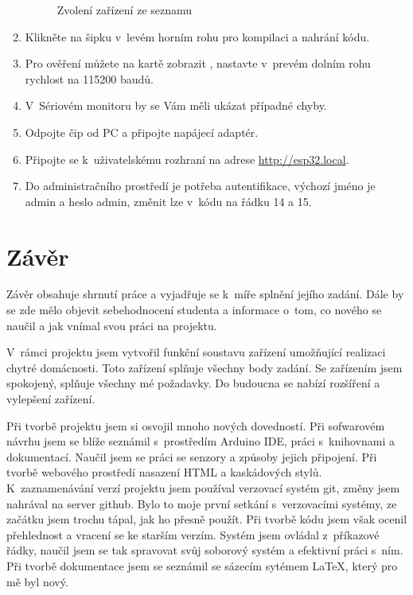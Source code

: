 \documentclass[11pt,a4paper,twoside,openright]{report}
\begin{document}
\begin{enumerate}
\begin{figure}[h!]
			\caption{Zvolení zařízení ze seznamu}
		\end{figure}
		\item Klikněte na šipku v~levém horním rohu pro kompilaci a nahrání kódu.
		\item Pro ověření můžete na kartě  zobrazit , nastavte v~prevém dolním rohu rychlost na 115200 baudů. 
		\item V~Sériovém monitoru by se Vám měli ukázat případné chyby.
		\item Odpojte čip od PC a připojte napájecí adaptér.
		\item Připojte se k~uživatelskému rozhraní na adrese \url{http://esp32.local}.
		\item Do administračního prostředí je potřeba autentifikace, výchozí jméno je admin a heslo admin, změnit lze v~kódu na řádku 14 a 15.
	\end{enumerate}
	
	
	
	\chapter*{Závěr}
	\pagestyle{empty}
	
	
	Závěr obsahuje shrnutí práce a vyjadřuje se k~míře splnění jejího zadání. Dále by se zde mělo objevit sebehodnocení studenta a informace o~tom, co nového se naučil a jak vnímal svou práci na projektu.
	
	V~rámci projektu jsem vytvořil funkční soustavu zařízení umožňující realizaci chytré domácnosti. Toto zařízení splňuje všechny body zadání. Se zařízením jsem spokojený, splňuje všechny mé požadavky. Do budoucna se nabízí rozšíření a vylepšení zařízení.
	
	
	Při tvorbě projektu jsem si osvojil mnoho nových dovedností. Při sofwarovém návrhu jsem se blíže seznámil s~prostředím Arduino IDE, práci s~knihovnami a dokumentací. Naučil jsem se práci se senzory a způsoby jejich připojení. Při tvorbě webového prostředí nasazení HTML a kaskádových stylů. K~zaznamenávání verzí projektu jsem používal verzovací systém git, změny jsem nahrával na server github. Bylo to moje první setkání s~verzovacími systémy, ze začátku jsem trochu tápal, jak ho přesně použít. Při tvorbě kódu jsem však ocenil přehlednost a vracení se ke starším verzím. Systém jsem ovládal z~příkazové řádky, naučil jsem se tak spravovat svůj soborový systém a efektivní práci s~ním. Při tvorbě dokumentace jsem se seznámil se sázecím sytémem \LaTeX, který pro mě byl nový.
	
\end{document}
